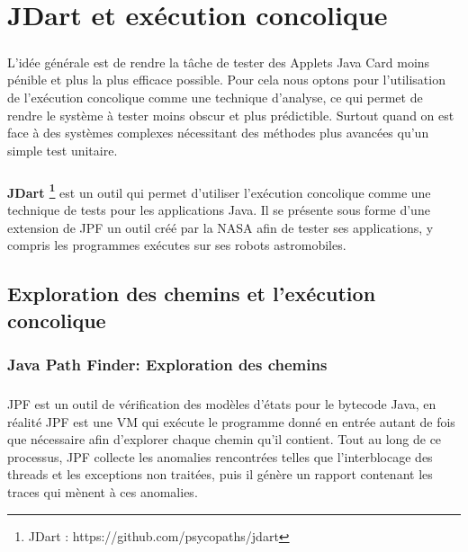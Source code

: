 \chapter{JDart et exécution concolique}
	\paragraph{}
		L'idée générale est de rendre la tâche de tester des Applets Java Card moins pénible et plus la plus efficace possible.
		Pour cela nous optons pour l'utilisation de l'exécution concolique comme une technique d'analyse, ce qui permet de rendre 
		le système à tester moins obscur et plus prédictible. Surtout quand on est face à des systèmes complexes
		nécessitant des méthodes plus avancées qu'un simple test unitaire.
    
	\paragraph{}
		\textbf{JDart \footnote{JDart : https://github.com/psycopaths/jdart}} est un outil qui permet d'utiliser l'exécution concolique
		comme une technique de tests pour les applications Java.
		\newline
		Il se présente sous forme d'une extension de \gls{JPF} un outil créé par la NASA afin de tester ses applications, y compris les programmes exécutes sur ses robots astromobiles.
	\section{Exploration des chemins et l'exécution concolique}
		\subsection{Java Path Finder: Exploration des chemins}
			\nocite{JPF}
			
			\paragraph{}
				\gls{JPF} est un outil de vérification des modèles d'états pour le bytecode Java,
				en réalité \gls{JPF} est une \gls{VM} qui exécute le programme donné en entrée autant de fois que nécessaire
				afin d'explorer chaque chemin qu'il contient.
				Tout au long de ce processus, \gls{JPF} collecte les anomalies rencontrées telles que l'interblocage des threads et les exceptions non traitées, puis il génère un rapport contenant les traces qui mènent à ces anomalies.
	
